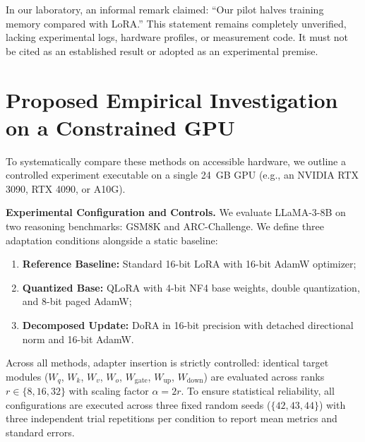 \documentclass[11pt,a4paper]{article}
\begin{document}
In our laboratory, an informal remark claimed: ``Our pilot halves training memory compared with LoRA.'' This statement remains completely unverified, lacking experimental logs, hardware profiles, or measurement code. It must not be cited as an established result or adopted as an experimental premise.

\section{Proposed Empirical Investigation on a Constrained GPU}

To systematically compare these methods on accessible hardware, we outline a controlled experiment executable on a single 24~GB GPU (e.g., an NVIDIA RTX 3090, RTX 4090, or A10G).

\textbf{Experimental Configuration and Controls.} We evaluate LLaMA-3-8B on two reasoning benchmarks: GSM8K and ARC-Challenge. We define three adaptation conditions alongside a static baseline:
\begin{enumerate}
    \item \textbf{Reference Baseline:} Standard 16-bit LoRA with 16-bit AdamW optimizer;
    \item \textbf{Quantized Base:} QLoRA with 4-bit NF4 base weights, double quantization, and 8-bit paged AdamW;
    \item \textbf{Decomposed Update:} DoRA in 16-bit precision with detached directional norm and 16-bit AdamW.
\end{enumerate}
Across all methods, adapter insertion is strictly controlled: identical target modules ($W_q$, $W_k$, $W_v$, $W_o$, $W_{\text{gate}}$, $W_{\text{up}}$, $W_{\text{down}}$) are evaluated across ranks $r \in \{8, 16, 32\}$ with scaling factor $\alpha = 2r$. To ensure statistical reliability, all configurations are executed across three fixed random seeds ($\{42, 43, 44\}$) with three independent trial repetitions per condition to report mean metrics and standard errors.
\end{document}
